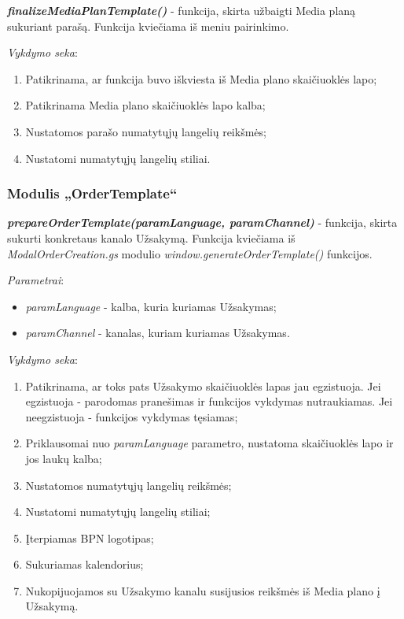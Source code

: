 \bigskip
\textit{\textbf{finalizeMediaPlanTemplate()}} - funkcija, skirta užbaigti Media planą sukuriant parašą. Funkcija kviečiama iš meniu pairinkimo.

\bigskip
\textit{Vykdymo seka}:
\begin{enumerate}
    \itemsep0em 
    \item Patikrinama, ar funkcija buvo iškviesta iš Media plano skaičiuoklės lapo;
    \item Patikrinama Media plano skaičiuoklės lapo kalba;
    \item Nustatomos parašo numatytųjų langelių reikšmės;
    \item Nustatomi numatytųjų langelių stiliai.
\end{enumerate}



\subsubsection{Modulis „OrderTemplate“}

\textit{\textbf{prepareOrderTemplate(paramLanguage, paramChannel)}} - funkcija, skirta sukurti konkretaus kanalo Užsakymą. Funkcija kviečiama iš \textit{ModalOrderCreation.gs} modulio \textit{window.generateOrderTemplate()} funkcijos.

\bigskip
\textit{Parametrai}:
\begin{itemize}
    \itemsep0em 
    \item \textit{paramLanguage} - kalba, kuria kuriamas Užsakymas;
    \item \textit{paramChannel} - kanalas, kuriam kuriamas Užsakymas.
\end{itemize}

\bigskip
\textit{Vykdymo seka}:
\begin{enumerate}
    \itemsep0em 
    \item Patikrinama, ar toks pats Užsakymo skaičiuoklės lapas jau egzistuoja. Jei egzistuoja - parodomas pranešimas ir funkcijos vykdymas nutraukiamas. Jei neegzistuoja - funkcijos vykdymas tęsiamas;
    \item Priklausomai nuo \textit{paramLanguage} parametro, nustatoma skaičiuoklės lapo ir jos laukų kalba;
    \item Nustatomos numatytųjų langelių reikšmės;
    \item Nustatomi numatytųjų langelių stiliai;
    \item Įterpiamas BPN logotipas;
    \item Sukuriamas kalendorius;
    \item Nukopijuojamos su Užsakymo kanalu susijusios reikšmės iš Media plano į Užsakymą.
\end{enumerate}


